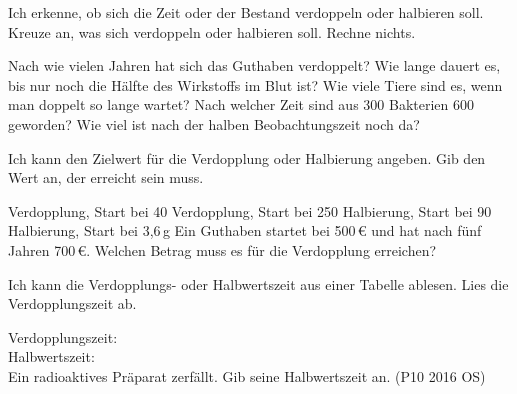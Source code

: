 \setcounter{aufgabe}{49}

\begin{aufgabe}{Ich erkenne, ob sich die Zeit oder der Bestand verdoppeln oder halbieren soll.}
Kreuze an, was sich verdoppeln oder halbieren soll. Rechne nichts.
\begin{teile}
\teil Nach wie vielen Jahren hat sich das Guthaben verdoppelt? \quad {}
\teil Wie lange dauert es, bis nur noch die Hälfte des Wirkstoffs im Blut ist? \quad {}
\teil Wie viele Tiere sind es, wenn man doppelt so lange wartet? \quad {}
\teil Nach welcher Zeit sind aus 300 Bakterien 600 geworden? \quad {}
\teil Wie viel ist nach der halben Beobachtungszeit noch da? \quad {}
\end{teile}
\end{aufgabe}

\begin{aufgabe}{Ich kann den Zielwert für die Verdopplung oder Halbierung angeben.}
Gib den Wert an, der erreicht sein muss.
\begin{teile}
\teil Verdopplung, Start bei 40 \quad \leerfeld
\teil Verdopplung, Start bei 250 \quad \leerfeld
\teil Halbierung, Start bei 90 \quad \leerfeld
\teil Halbierung, Start bei 3,6\,g \quad \leerfeld[g]
\teil Ein Guthaben startet bei 500\,€ und hat nach fünf Jahren 700\,€. Welchen Betrag muss es für die Verdopplung erreichen? \leerfeld[€]
\end{teile}
\end{aufgabe}

\begin{aufgabe}{Ich kann die Verdopplungs- oder Halbwertszeit aus einer Tabelle ablesen.}
Lies die Verdopplungszeit ab.
\begin{teile}
\teil {} \quad {}
\end{teile}
\begin{teile}
\teil Verdopplungszeit: \\  \quad {}
\teil Halbwertszeit: \\  \quad {}
\teil Ein radioaktives Präparat zerfällt. Gib seine Halbwertszeit an. (P10 2016 OS) \\  \quad {}
\end{teile}
\end{aufgabe}


